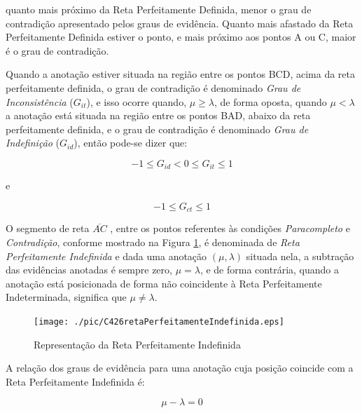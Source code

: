 quanto mais próximo da Reta Perfeitamente Definida, menor o grau de contradição apresentado pelos graus de evidência. 
Quanto mais afastado da Reta Perfeitamente Definida estiver o ponto, e mais próximo aos pontos A ou C, maior é o grau de contradição. 

Quando a anotação estiver situada na região entre os pontos BCD, acima da reta perfeitamente definida, o grau de contradição é denominado 
\emph{Grau de Inconsistência} ($G_{it}$), 
e isso ocorre quando, $\mu \ge \lambda $, de forma oposta, quando $\mu < \lambda $ a anotação está situada na região entre os pontos BAD, abaixo da reta perfeitamente definida, e o grau de contradição é denominado 
\emph{Grau de Indefinição} ($G_{id}$), 
então pode-se dizer que:

\begin{center}
\begin{equation}
-1 \le G _{id}  <  0 \le G _{it} \le 1
\label{eq:grauInconsistenciaIndefinicao}
\end{equation}
\end{center}
e
\begin{center}
\begin{equation}
-1 \le G _{ct} \le 1
\label{eq:grauInconsistenciaIndefinicao1}
\end{equation}
\end{center}




O segmento de reta $\overline{ AC }$ , entre os pontos referentes às condições \emph{Paracompleto} e \emph{Contradição}, conforme mostrado na Figura \ref{fig:retaPerfeitamenteIndefinida}, é denominada de \emph{Reta Perfeitamente Indefinida} e dada uma anotação $(\mu, \lambda )$ situada nela, a subtração das evidências anotadas é sempre zero, $\mu = \lambda$, e de forma contrária, quando a anotação está posicionada de forma não coincidente à Reta Perfeitamente Indeterminada, significa que $\mu \neq \lambda$.

\begin{figure}[!htb]
\center\texttt{[image: ./pic/C426retaPerfeitamenteIndefinida.eps]}
\caption{Representação da Reta Perfeitamente Indefinida}
\label{fig:retaPerfeitamenteIndefinida}
\end{figure}

A relação dos graus de evidência para uma anotação cuja posição coincide com a Reta Perfeitamente Indefinida é: 

\begin{center}
\begin{equation}
\mu - \lambda = 0
\label{eq:evidenciaIndefinida}
\end{equation}
\end{center}

